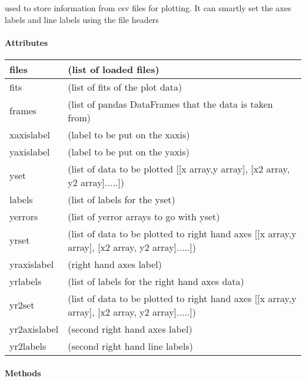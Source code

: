 \documentclass[letterpaper,10pt,english]{sphinxmanual}
\begin{document}
\begin{fulllineitems}
\label{pubplots:pubplots.plotdata.PlotData}
used to store information from csv files for plotting. It can smartly set the axes labels
and line labels using the file headers
\paragraph{Attributes}

\noindent\begin{tabulary}{\linewidth}{|L|L|}
\hline

files
&
(list of loaded files)
\\
\hline
fits
&
(list of fits of the plot data)
\\
\hline
frames
&
(list of pandas DataFrames that the data is taken from)
\\
\hline
xaxislabel
&
(label to be put on the xaxis)
\\
\hline
yaxislabel
&
(label to be put on the yaxis)
\\
\hline
yset
&
(list of data to be plotted {[}{[}x array,y array{]}, {[}x2 array, y2 array{]}.....{]})
\\
\hline
labels
&
(list of labels for the yset)
\\
\hline
yerrors
&
(list of yerror arrays to go with yset)
\\
\hline
yrset
&
(list of data to be plotted to right hand axes {[}{[}x array,y array{]}, {[}x2 array, y2 array{]}.....{]})
\\
\hline
yraxislabel
&
(right hand axes label)
\\
\hline
yrlabels
&
(list of labels for the right hand axes data)
\\
\hline
yr2set
&
(list of data to be plotted to right hand axes {[}{[}x array,y array{]}, {[}x2 array, y2 array{]}.....{]})
\\
\hline
yr2axislabel
&
(second right hand axes label)
\\
\hline
yr2labels
&
(second right hand line labels)
\\
\hline\end{tabulary}

\paragraph{Methods}


\end{fulllineitems}
\end{document}
